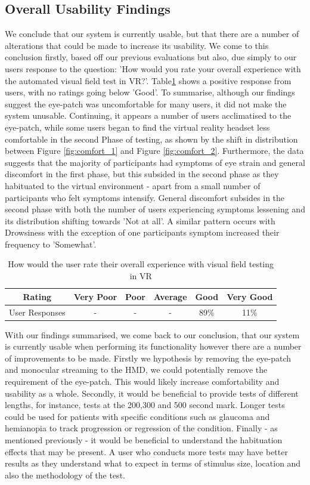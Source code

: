 \documentclass{l4proj}
\begin{document}
\subsection{Overall Usability Findings}
We conclude that our system is currently usable, but that there are a number of alterations that could be made to increase its usability. We come to this conclusion firstly, based off our previous evaluations but also, due simply to our users response to the question: 'How would you rate your overall experience with the automated visual field test in VR?'. Table\ref{table:overall_experience} shows a positive response from users, with no ratings going below 'Good'. To summarise, although our findings suggest the eye-patch was uncomfortable for many users, it did not make the system unusable. Continuing, it appears a number of users acclimatised to the eye-patch, while some users began to find the virtual reality headset less comfortable in the second Phase of testing, as shown by the shift in distribution between Figure \ref{fig:comfort_1} and Figure \ref{fig:comfort_2}. Furthermore, the data suggests that the majority of participants had symptoms of eye strain and general discomfort in the first phase, but this subsided in the second phase as they habituated to the virtual environment - apart from a small number of participants who felt symptoms intensify. General discomfort subsides in the second phase with both the number of users experiencing symptoms lessening and its distribution shifting towards 'Not at all'. A similar pattern occurs with Drowsiness with the exception of one participants symptom increased their frequency to 'Somewhat'.
\begin{table}[h]
    \centering
    \caption{How would the user rate their overall experience with visual field testing in VR}
    \label{table:overall_experience}
    \begin{tabular}{|c|c|c|c|c|c|}
        \hline
        \textbf{Rating} & Very Poor & Poor & Average & Good & Very Good \\
        \hline
        User Responses & - & - & - & 89\% & 11\%\\
        \hline
    \end{tabular}
\end{table}

With our findings summarised, we come back to our conclusion, that our system is currently usable when performing its functionality however there are a number of improvements to be made. Firstly we hypothesis by removing the eye-patch and monocular streaming to the HMD, we could potentially remove the requirement of the eye-patch. This would likely increase comfortability and usability as a whole. Secondly, it would be beneficial to provide tests of different lengths, for instance, tests at the 200,300 and 500 second mark. Longer tests could be used for patients with specific conditions such as glaucoma and hemianopia to track progression or regression of the condition. Finally - as mentioned previously - it would be beneficial to understand the habituation effects that may be present. A user who conducts more tests may have better results as they understand what to expect in terms of stimulus size, location and also the methodology of the test.
\end{document}

